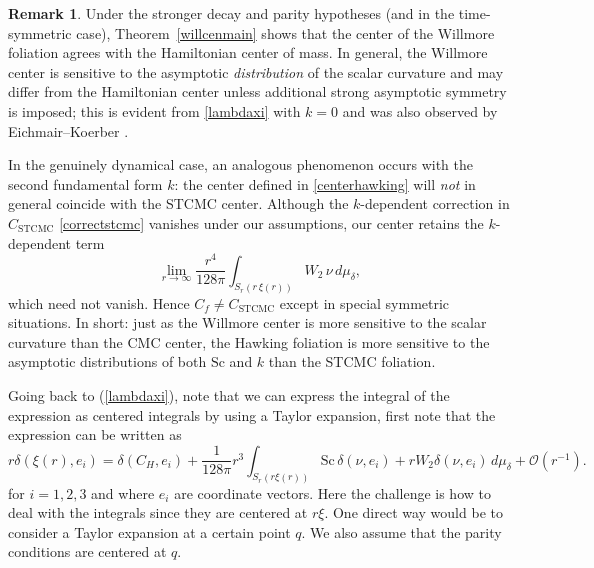 \documentclass[12pt,a4paper]{amsart}
\theoremstyle{plain}
\theoremstyle{definition}
\newtheorem{remark}[theorem]{Remark}
\begin{document}
\begin{remark}
Under the stronger decay and parity hypotheses (and in the time-symmetric case), Theorem~\ref{willcenmain} shows that the center of the Willmore foliation agrees with the Hamiltonian center of mass. In general, the Willmore center is sensitive to the asymptotic \emph{distribution} of the scalar curvature and may differ from the Hamiltonian center unless additional strong asymptotic symmetry is imposed; this is evident from \eqref{lambdaxi} with \(k=0\) and was also observed by Eichmair–Koerber \cite{willcen}. 

In the genuinely dynamical case, an analogous phenomenon occurs with the second fundamental form \(k\): the center defined in \eqref{centerhawking} will \emph{not} in general coincide with the STCMC center. Although the \(k\)-dependent correction in \(C_{\mathrm{STCMC}}\) \eqref{correctstcmc} vanishes under our assumptions, our center retains the \(k\)-dependent term
\[
\lim_{r\to\infty}\frac{r^{4}}{128\pi}\int_{S_r(r\,\xi(r))} W_2\, \nu \, d\mu_\delta,
\]
which need not vanish. Hence \(C_f \neq C_{\mathrm{STCMC}}\) except in special symmetric situations. In short: just as the Willmore center is more sensitive to the scalar curvature than the CMC center, the Hawking foliation is more sensitive to the asymptotic distributions of both \(\mathrm{Sc}\) and \(k\) than the STCMC foliation.
\end{remark}





Going back to (\ref{lambdaxi}), note that we can express the integral of the expression as centered integrals by using a Taylor expansion,  first note that the expression can be written as 
$$r \delta(  \xi(r), e_i ) = \delta(  C_H, e_i ) + \frac{1}{128 \pi} r^3 \int_{S_r(r \xi(r))} \mathrm{Sc} \,\delta( \nu, e_i )  +r W_2 \delta(  \nu,  e_i )  \, d\mu_{\delta} + \mathcal{O}(r^{-1}). $$
for $i=1,2,3$ and where $e_i$ are  coordinate vectors. Here the challenge is how to deal with the integrals since they are centered at $r \xi$. One direct way would be to consider a Taylor expansion at a certain point $q$. We also assume that the parity conditions are centered at $q$.
\end{document}
